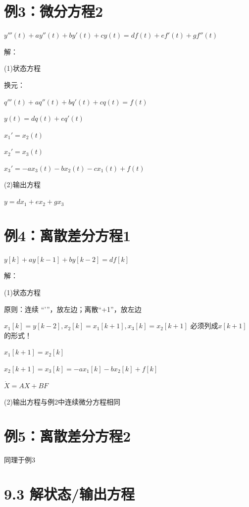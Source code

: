 \documentclass[UTF8]{ctexart}
\begin{document}
 \section{例3：微分方程2}
 $y'''(t)+ay''(t)+by'(t)+cy(t)=df(t)+ef'(t)+gf''(t)$  \par
 解： \par
 (1)状态方程 \par
换元： \par
\qquad $q'''(t)+aq''(t)+bq'(t)+cq(t)=f(t)$  \par
\qquad $y(t)=dq(t)+eq'(t)$  \par
\qquad $x_1'=x_2(t)$  \par
\qquad $x_2'=x_3(t)$  \par
\qquad $x_3'=-ax_3(t)-bx_2(t)-cx_1(t)+f(t)$  \par
(2)输出方程 \par
$y=dx_1+ex_2+gx_3$  \par
\section{例4：离散差分方程1}
$y[k]+ay[k-1]+by[k-2]=df[k]$  \par
解： \par
(1)状态方程 \par
原则：连续 “'”，放左边；离散“+1”，放左边 \par
$x_1[k]=y[k-2],x_2[k]=x_1[k+1],x_3[k]=x_2[k+1]$ \qquad 必须列成$x[k+1]$ 的形式！\par
$x_1[k+1]=x_2[k]$ \par
$x_2[k+1]=x_3[k]=-ax_1[k]-bx_2[k]+f[k]$ \par
$\dot{X} = AX+ BF$\par
(2)输出方程与例2中连续微分方程相同 \par
\section{例5：离散差分方程2}
同理于例3 \par
\section{9.3 解状态/输出方程}
\end{document}
